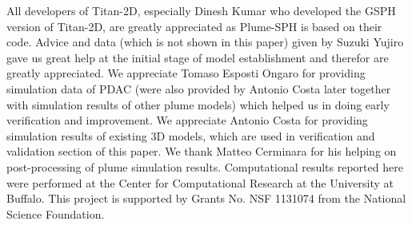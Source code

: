 \documentclass[journal abbreviation, manuscript]{copernicus}
\begin{document}

\begin{acknowledgements}
All developers of Titan-2D, especially Dinesh Kumar who developed the GSPH version of Titan-2D, are greatly appreciated as Plume-SPH is based on their code. Advice and data (which is not shown in this paper) given by Suzuki Yujiro gave us great help at the initial stage of model establishment and therefor are greatly appreciated. We appreciate Tomaso Esposti Ongaro for providing simulation data of PDAC (were also provided by Antonio Costa later together with simulation results of other plume models) which helped us in doing early verification and improvement. We appreciate Antonio Costa for providing simulation results of existing 3D models, which are used in verification and validation section of this paper. We thank Matteo Cerminara for his helping on post-processing of plume simulation results. Computational results reported here were performed at the Center for Computational Research at the University at Buffalo. This project is supported by Grants No. NSF 1131074 from the National Science Foundation.
\end{acknowledgements}


\end{document}
